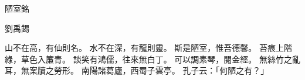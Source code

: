 陋室銘

劉禹錫

山不在高，有仙則名。
水不在深，有龍則靈。
斯是陋室，惟吾德馨。
苔痕上階綠，草色入簾青。
談笑有鴻儒，往來無白丁。
可以調素琴，閱金經。
無絲竹之亂耳，無案牘之勞形。
南陽諸葛廬，西蜀子雲亭。
孔子云：「何陋之有？」

